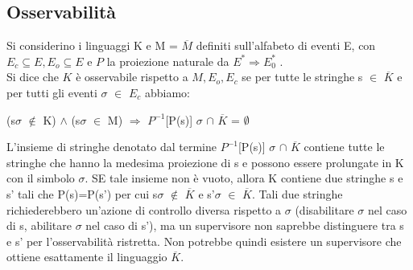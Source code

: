 \documentclass[a4paper, 11pt]{article}
\begin{document}
\subsection{Osservabilità}
Si considerino i linguaggi K e M = $\overline{M}$ definiti sull'alfabeto di eventi E, con $E_{c} \subseteq E, E_o \subseteq E$ e $P$ la proiezione naturale da $E^\ast \Rightarrow E_0^\ast$ .\\ Si dice che $K$ è osservabile rispetto a $M, E_{o},E_{c}$ se per tutte le stringhe s $\in$ $\overline{K}$ e per tutti gli eventi $\sigma$ $\in$ $E_c$ abbiamo: 
\begin{center}(s$\sigma$ $\notin$ K) $\land$ (s$\sigma$ $\in$ M) $\Rightarrow$ $P^{-1}$[P(s)] $\sigma$  $\cap$ $\overline{K}$ = $\emptyset$
\end{center}
L'insieme di stringhe denotato dal termine $P^{-1}$[P(s)] $\sigma$  $\cap$ $\overline{K}$ contiene tutte le stringhe che hanno la medesima proiezione di s e possono essere prolungate in K con il simbolo $\sigma$. SE tale insieme non è vuoto, allora K contiene due stringhe s e s' tali che P(s)=P(s') per cui s$\sigma$ $\notin$ $\overline{K}$ e s'$\sigma$ $\in$ $\overline{K}$. Tali due stringhe richiederebbero un'azione di controllo diversa rispetto a $\sigma$ (disabilitare $\sigma$ nel caso di s, abilitare $\sigma$ nel caso di s'), ma un supervisore non saprebbe distinguere tra s e s' per l'osservabilità ristretta. Non potrebbe quindi esistere un supervisore che ottiene esattamente il linguaggio $\overline{K}$.
\end{document}
